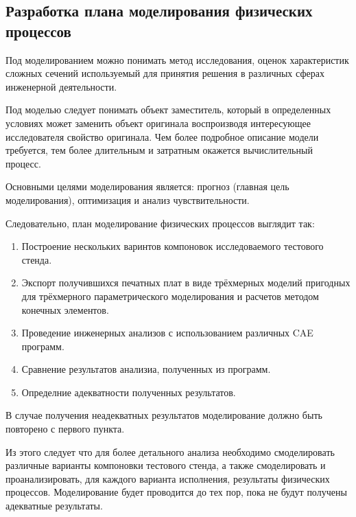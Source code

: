 \subsection{Разработка плана моделирования физических процессов}

Под моделированием можно понимать метод исследования, оценок характеристик сложных сечений используемый для принятия решения в различных сферах инженерной деятельности.

Под моделью следует понимать объект заместитель, который в определенных условиях может заменить объект оригинала воспроизводя интересующее исследователя свойство оригинала. Чем более подробное описание модели требуется, тем более длительным и затратным окажется вычислительный
процесс.

Основными целями моделирования является: прогноз (главная цель моделирования), оптимизация и анализ чувствительности.

Следовательно, план моделирование физических процессов выглядит так:
\begin{enumerate}[label={\arabic*.}]
\item Построение нескольких варинтов компоновок исследоваемого тестового стенда.
\item Экспорт получившихся печатных плат в виде трёхмерных моделий пригодных для трёхмерного параметрического моделирования и расчетов методом конечных элементов.
\item Проведение инженерных анализов с использованием различных CAE программ.
\item Сравнение результатов анализиа, полученных из программ.
\item Определние адекватности полученных результатов.  
\end{enumerate}



В случае получения неадекватных результатов моделирование должно быть повторено с первого пункта.

Из этого следует что для более детального анализа необходимо
смоделировать различные варианты компоновки тестового стенда, а также
смоделировать и проанализировать, для каждого варианта исполнения,
результаты физических процессов. Моделирование будет проводится до тех
пор, пока не будут получены адекватные результаты.
